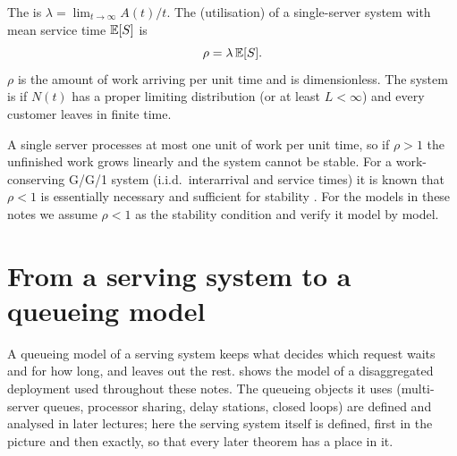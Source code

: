 \begin{definition}\label{def:load}
The  is $\lambda=\lim_{t\to\infty}A(t)/t$.
The  (utilisation) of a single-server system with mean service time
$\mathbb{E}[S]$ is
\[
  \rho=\lambda\,\mathbb{E}[S].
\]
$\rho$ is the amount of work arriving per unit time and is dimensionless.
The system is  if $N(t)$ has a proper limiting distribution (or at least
$L<\infty$) and every customer leaves in finite time.
\end{definition}

A single server processes at most one unit of work per unit time, so if $\rho>1$ the
unfinished work grows linearly and the system cannot be stable. For a work-conserving
G/G/1 system (i.i.d.\ interarrival and service times) it is known that $\rho<1$ is
essentially necessary and sufficient for stability \cite{loynes1962}. For the models
in these notes we assume $\rho<1$ as the stability condition and verify it model by
model.

\section{From a serving system to a queueing model}\label{L1:sec:model}

A queueing model of a serving system keeps what decides which request waits and for
how long, and leaves out the rest.  shows the model of a
disaggregated deployment used throughout these notes. The queueing objects it uses
(multi-server queues, processor sharing, delay stations, closed loops) are defined and
analysed in later lectures; here the serving system itself is defined, first in the
picture and then exactly, so that every later theorem has a place in it.

